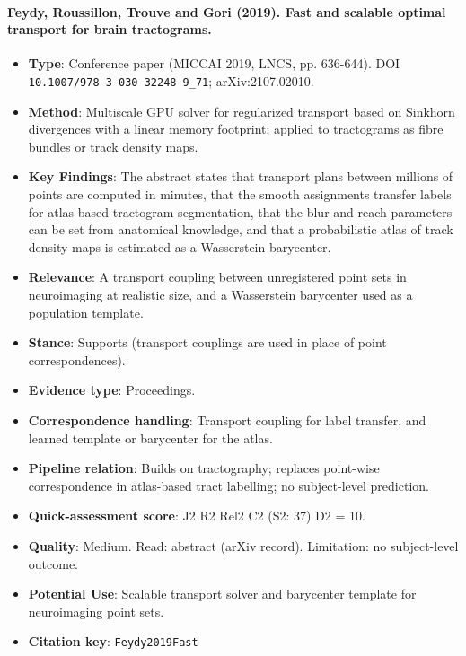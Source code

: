 \documentclass[journal,onecolumn]{IEEEtran}
\begin{document}
\paragraph{Feydy, Roussillon, Trouve and Gori (2019). Fast and scalable optimal transport for brain tractograms.~\cite{Feydy2019Fast}}\mbox{}

\begin{itemize}

\item{} \textbf{Type}: Conference paper (MICCAI 2019, LNCS, pp. 636-644). DOI \nolinkurl{10.1007/978-3-030-32248-9_71}; arXiv:2107.02010.

\item{} \textbf{Method}: Multiscale GPU solver for regularized transport based on Sinkhorn divergences with a linear memory footprint; applied to tractograms as fibre bundles or track density maps.

\item{} \textbf{Key Findings}: The abstract states that transport plans between millions of points are computed in minutes, that the smooth assignments transfer labels for atlas-based tractogram segmentation, that the blur and reach parameters can be set from anatomical knowledge, and that a probabilistic atlas of track density maps is estimated as a Wasserstein barycenter.

\item{} \textbf{Relevance}: A transport coupling between unregistered point sets in neuroimaging at realistic size, and a Wasserstein barycenter used as a population template.

\item{} \textbf{Stance}: Supports (transport couplings are used in place of point correspondences).

\item{} \textbf{Evidence type}: Proceedings.

\item{} \textbf{Correspondence handling}: Transport coupling for label transfer, and learned template or barycenter for the atlas.

\item{} \textbf{Pipeline relation}: Builds on tractography; replaces point-wise correspondence in atlas-based tract labelling; no subject-level prediction.

\item{} \textbf{Quick-assessment score}: J2 R2 Rel2 C2 (S2: 37) D2 = 10.

\item{} \textbf{Quality}: Medium. Read: abstract (arXiv record). Limitation: no subject-level outcome.

\item{} \textbf{Potential Use}: Scalable transport solver and barycenter template for neuroimaging point sets.

\item{} \textbf{Citation key}: \texttt{Feydy2019Fast}

\end{itemize}
\end{document}

